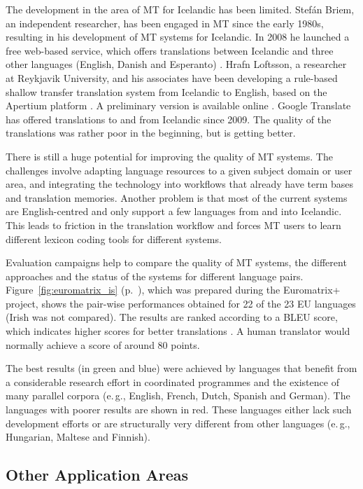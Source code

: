 \begin{multicols}{2}
The development in the area of MT for Icelandic has been limited. Stefán Briem, an independent researcher, has been engaged in MT since the early 1980s, resulting in his development of MT systems for Icelandic. In 2008 he launched a free web-based service, which offers translations between Icelandic and three other languages (English, Danish and Esperanto) \cite{tut1}. Hrafn Loftsson, a researcher at Reykjavik University, and his associates have been developing a rule-based shallow transfer translation system from Icelandic to English, based on the Apertium platform \cite{ape1}. A preliminary version is available online \cite{ape2}.  Google Translate has offered translations to and from Icelandic since 2009. The quality of the translations was rather poor in the beginning, but is getting better.

There is still a huge potential for improving the quality of MT systems. The challenges involve adapting language resources to a given subject domain or user area, and integrating the technology into workflows that already have term bases and translation memories. Another problem is that most of the current systems are English-centred and only support a few languages from and into Icelandic. This leads to friction in the translation workflow and forces MT users to learn different lexicon coding tools for different systems.

Evaluation campaigns help to compare the quality of MT systems, the different approaches and the status of the systems for different language pairs. Figure~\ref{fig:euromatrix_is} (p.~\pageref{fig:euromatrix_is}), which was prepared during the Euromatrix+ project, shows the pair-wise performances obtained for 22 of the 23 EU languages (Irish was not compared). The results are ranked according to a BLEU score, which indicates higher scores for better translations \cite{bleu1}. A human translator would normally achieve a score of around 80 points.

The best results (in green and blue) were achieved by languages that benefit from a considerable research effort in coordinated programmes and the existence of many parallel corpora (e.\,g., English, French, Dutch, Spanish and German). The languages with poorer results are shown in red. These languages either lack such development efforts or are structurally very different from other languages (e.\,g., Hungarian, Maltese and Finnish).

\subsection{Other Application Areas}


\end{multicols}
